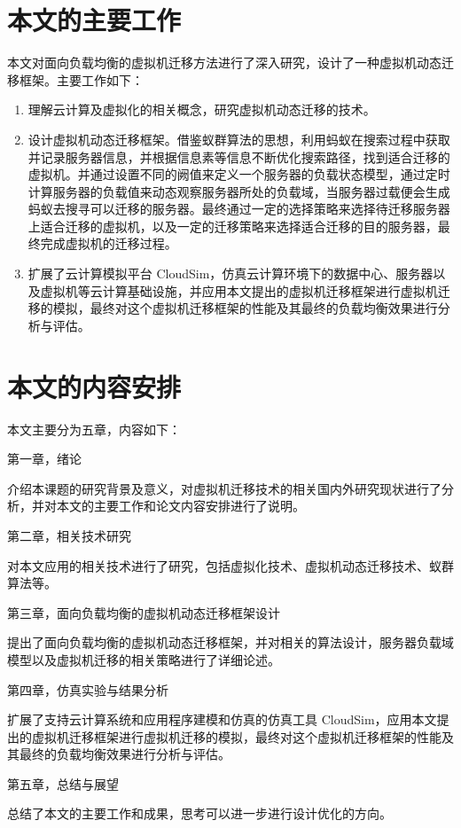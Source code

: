 \section{本文的主要工作}
本文对面向负载均衡的虚拟机迁移方法进行了深入研究，设计了一种虚拟机动态迁移框架。主要工作如下：
\begin{enumerate}
    \item 理解云计算及虚拟化的相关概念，研究虚拟机动态迁移的技术。
    \item 设计虚拟机动态迁移框架。借鉴蚁群算法的思想，利用蚂蚁在搜索过程中获取并记录服务器信息，并根据信息素等信息不断优化搜索路径，找到适合迁移的虚拟机。并通过设置不同的阙值来定义一个服务器的负载状态模型，通过定时计算服务器的负载值来动态观察服务器所处的负载域，当服务器过载便会生成蚂蚁去搜寻可以迁移的服务器。最终通过一定的选择策略来选择待迁移服务器上适合迁移的虚拟机，以及一定的迁移策略来选择适合迁移的目的服务器，最终完成虚拟机的迁移过程。
    \item 扩展了云计算模拟平台 CloudSim，仿真云计算环境下的数据中心、服务器以及虚拟机等云计算基础设施，并应用本文提出的虚拟机迁移框架进行虚拟机迁移的模拟，最终对这个虚拟机迁移框架的性能及其最终的负载均衡效果进行分析与评估。
\end{enumerate}

\section{本文的内容安排}
本文主要分为五章，内容如下：

第一章，绪论

介绍本课题的研究背景及意义，对虚拟机迁移技术的相关国内外研究现状进行了分析，并对本文的主要工作和论文内容安排进行了说明。

第二章，相关技术研究

对本文应用的相关技术进行了研究，包括虚拟化技术、虚拟机动态迁移技术、蚁群算法等。

第三章，面向负载均衡的虚拟机动态迁移框架设计

提出了面向负载均衡的虚拟机动态迁移框架，并对相关的算法设计，服务器负载域模型以及虚拟机迁移的相关策略进行了详细论述。

第四章，仿真实验与结果分析

扩展了支持云计算系统和应用程序建模和仿真的仿真工具 CloudSim，应用本文提出的虚拟机迁移框架进行虚拟机迁移的模拟，最终对这个虚拟机迁移框架的性能及其最终的负载均衡效果进行分析与评估。

第五章，总结与展望

总结了本文的主要工作和成果，思考可以进一步进行设计优化的方向。

